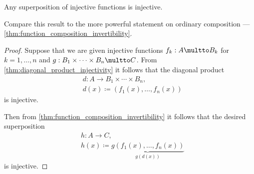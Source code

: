 \begin{proposition}\label{thm:function_superposition_invertibility}
  Any superposition of injective functions is injective.
\end{proposition}
\begin{comments}
  \item Compare this result to the more powerful statement on ordinary composition --- \cref{thm:function_composition_invertibility}.
\end{comments}
\begin{proof}
  Suppose that we are given injective functions \( f_k: A \multto B_k \) for \( k = 1, \ldots, n \) and \( g: B_1 \times \cdots \times B_n \multto C \). From \cref{thm:diagonal_product_injectivity} it follows that the diagonal product
  \begin{equation*}
    \begin{aligned}
      &d: A \to B_1 \times \cdots \times B_n, \\
      &d(x) \coloneqq (f_1(x), \ldots, f_n(x))
    \end{aligned}
  \end{equation*}
  is injective.

  Then from \cref{thm:function_composition_invertibility} it follows that the desired superposition
  \begin{equation*}
    \begin{aligned}
      &h: A \to C, \\
      &h(x) \coloneqq \underbrace{g(f_1(x), \ldots, f_n(x))}_{g(d(x))}
    \end{aligned}
  \end{equation*}
  is injective.
\end{proof}


